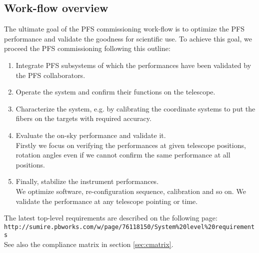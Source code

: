 \subsection{Work-flow overview}

The ultimate goal of the PFS commissioning work-flow is to optimize the PFS performance and validate the goodness for scientific use.
To achieve this goal, we proceed the PFS commissioning following this outline:
\begin{enumerate}
\item Integrate PFS subsystems of which the performances have been validated by the PFS collaborators.
\item Operate the system and confirm their functions on the telescope.
\item Characterize the system, e.g. by calibrating the coordinate systems to put the fibers on the targets with required accuracy.
\item Evaluate the on-sky performance and validate it. \\
Firstly we focus on verifying the performances at given telescope positions, rotation angles even if we cannot confirm the same performance at all positions.
\item Finally, stabilize the instrument performances. \\
We optimize software, re-configuration sequence, calibration and so on.
We validate the performance at any telescope pointing or time.
\end{enumerate}

The latest top-level requirements are described on the following page: \\
{\tt http://sumire.pbworks.com/w/page/76118150/System\%20level\%20requirements}\\
See also the compliance matrix in section \ref{sec:cmatrix}.

\bigskip

